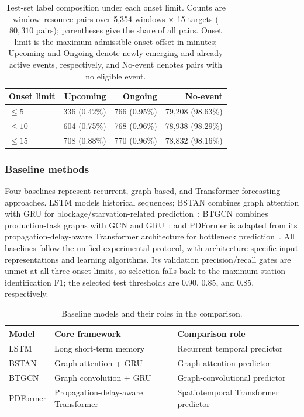 \documentclass[a4paper,fleqn]{cas-dc}
\begin{document}
\begin{table}[pos=!htbp]
\centering
\caption{Test-set label composition under each onset limit. Counts are window--resource pairs over 5,354 windows $\times$ 15 targets ($80{,}310$ pairs); parentheses give the share of all pairs. Onset limit is the maximum admissible onset offset in minutes; Upcoming and Ongoing denote newly emerging and already active events, respectively, and No-event denotes pairs with no eligible event.}
\label{tab:dataset-labels}
\scriptsize
\setlength{\tabcolsep}{3.2pt}
\renewcommand{\arraystretch}{1.08}
\begin{tabular*}{\columnwidth}{@{\extracolsep{\fill}}lrrr@{}}
\toprule
Onset limit & Upcoming & Ongoing & No-event \\
\midrule
$\leq5$ & 336 (0.42\%) & 766 (0.95\%) & 79,208 (98.63\%) \\
$\leq10$ & 604 (0.75\%) & 768 (0.96\%) & 78,938 (98.29\%) \\
$\leq15$ & 708 (0.88\%) & 770 (0.96\%) & 78,832 (98.16\%) \\
\bottomrule
\end{tabular*}
\end{table}

\subsubsection{Baseline methods}

Four baselines represent recurrent, graph-based, and Transformer forecasting approaches. LSTM models historical sequences; BSTAN combines graph attention with GRU for blockage/starvation-related prediction~\cite{lai2023bstan}; BTGCN combines production-task graphs with GCN and GRU~\cite{yin2025btgcn}; and PDFormer is adapted from its propagation-delay-aware Transformer architecture for bottleneck prediction~\cite{jiang2023pdformer}. All baselines follow the unified experimental protocol, with architecture-specific input representations and learning algorithms. Its validation precision/recall gates are unmet at all three onset limits, so selection falls back to the maximum station-identification F1; the selected test thresholds are 0.90, 0.85, and 0.85, respectively.

\begin{table}[pos=!htbp]
\centering
\caption{Baseline models and their roles in the comparison.}
\label{tab:exp-baselines}
\scriptsize
\setlength{\tabcolsep}{4pt}
\renewcommand{\arraystretch}{1.10}
\begin{tabularx}{\columnwidth}{@{}lXX@{}}
\toprule
Model & Core framework & Comparison role \\
\midrule
LSTM & Long short-term memory & Recurrent temporal predictor \\
BSTAN & Graph attention + GRU & Graph-attention predictor \\
BTGCN & Graph convolution + GRU & Graph-convolutional predictor \\
PDFormer & Propagation-delay-aware Transformer & Spatiotemporal Transformer predictor \\
\bottomrule
\end{tabularx}
\end{table}
\end{document}
